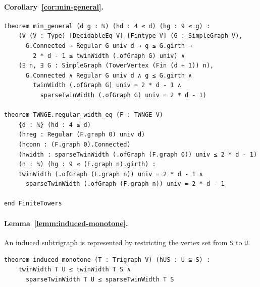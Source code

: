 \noindent\begin{minipage}{\linewidth}
\paragraph*{Corollary~\ref{cor:min-general}.}
\begin{lstlisting}
theorem min_general (d g : ℕ) (hd : 4 ≤ d) (hg : 9 ≤ g) :
    (∀ (V : Type) [DecidableEq V] [Fintype V] (G : SimpleGraph V),
      G.Connected → Regular G univ d → g ≤ G.girth →
        2 * d - 1 ≤ twinWidth (.ofGraph G) univ) ∧
    (∃ n, ∃ G : SimpleGraph (TowerVertex (Fin (d + 1)) n),
      G.Connected ∧ Regular G univ d ∧ g ≤ G.girth ∧
        twinWidth (.ofGraph G) univ = 2 * d - 1 ∧
          sparseTwinWidth (.ofGraph G) univ = 2 * d - 1)

theorem TWNGE.regular_width_eq (F : TWNGE V)
    {d : ℕ} (hd : 4 ≤ d)
    (hreg : Regular (F.graph 0) univ d)
    (hconn : (F.graph 0).Connected)
    (hwidth : sparseTwinWidth (.ofGraph (F.graph 0)) univ ≤ 2 * d - 1)
    (n : ℕ) (hg : 9 ≤ (F.graph n).girth) :
    twinWidth (.ofGraph (F.graph n)) univ = 2 * d - 1 ∧
      sparseTwinWidth (.ofGraph (F.graph n)) univ = 2 * d - 1

end FiniteTowers
\end{lstlisting}
\end{minipage}
\par\medskip
\noindent\begin{minipage}{\linewidth}
\paragraph*{Lemma~\ref{lemm:induced-monotone}.}
An induced subtrigraph is represented by restricting the vertex set from
\lstinline|S| to \lstinline|U|.
\begin{lstlisting}
theorem induced_monotone (T : Trigraph V) (hUS : U ⊆ S) :
    twinWidth T U ≤ twinWidth T S ∧
      sparseTwinWidth T U ≤ sparseTwinWidth T S
\end{lstlisting}
\end{minipage}
\par\medskip
